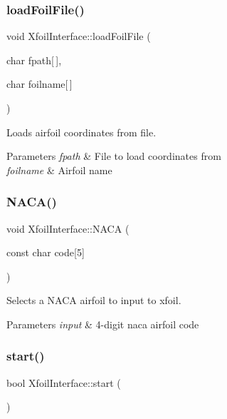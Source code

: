 \subsubsection{\texorpdfstring{load\+Foil\+File()}{loadFoilFile()}}
{\footnotesize\ttfamily void Xfoil\+Interface\+::load\+Foil\+File (\begin{DoxyParamCaption}\item[{char}]{fpath\mbox{[}$\,$\mbox{]},  }\item[{char}]{foilname\mbox{[}$\,$\mbox{]} }\end{DoxyParamCaption})}



Loads airfoil coordinates from file. 


\begin{DoxyParams}{Parameters}
{\em fpath} & File to load coordinates from \\
\hline
{\em foilname} & Airfoil name \\
\hline
\end{DoxyParams}
\mbox{\label{classXfoilInterface_a202072a14053054a55501c45a296bce7}} 
\subsubsection{\texorpdfstring{N\+A\+C\+A()}{NACA()}}
{\footnotesize\ttfamily void Xfoil\+Interface\+::\+N\+A\+CA (\begin{DoxyParamCaption}\item[{const char}]{code\mbox{[}5\mbox{]} }\end{DoxyParamCaption})}



Selects a N\+A\+CA airfoil to input to xfoil. 


\begin{DoxyParams}{Parameters}
{\em input} & 4-\/digit naca airfoil code \\
\hline
\end{DoxyParams}
\mbox{\label{classXfoilInterface_aba502bd5accaf23d3bdf342a82d5fb7f}} 
\subsubsection{\texorpdfstring{start()}{start()}}
{\footnotesize\ttfamily bool Xfoil\+Interface\+::start (\begin{DoxyParamCaption}{ }\end{DoxyParamCaption})}



